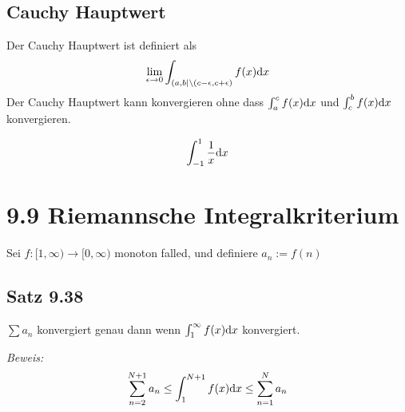 \documentclass[]{scrartcl}
\begin{document}
\subsection{Cauchy Hauptwert}
Der Cauchy Hauptwert ist definiert als
$$
\lim_{\epsilon\rightarrow 0}\int_{(a,b|\backslash (c-\epsilon, c+\epsilon)}f(x)\text dx
$$
Der Cauchy Hauptwert kann konvergieren ohne dass $\int_a^c f(x)\text dx$ und $\int_c^b f(x)\text dx$ konvergieren.

$$
\int_{-1}^1 \frac{1}{x}\text dx 
$$

\section{9.9 Riemannsche Integralkriterium}
Sei $f:[1,\infty)\rightarrow[0,\infty)$ monoton falled, und definiere $a_n := f(n)$

\subsection{Satz 9.38}
$\sum a_n$ konvergiert genau dann wenn $\int_1^\infty f(x)\text dx$ konvergiert.

\textit{Beweis: }
$$
\sum_{n=2}^{N+1}a_n \leq \int_1^{N+1}f(x)\text dx \leq \sum_{n=1}^N a_n
$$
\end{document}
